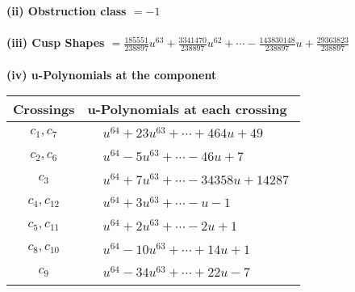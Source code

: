 \documentclass[1p]{elsarticle_modified}
\theoremstyle{definition}
\begin{document}
\flushleft \textbf{(ii) Obstruction class $= -1$}\\~\\
\flushleft \textbf{(iii) Cusp Shapes $= \frac{185551}{238897} u^{63}+\frac{3341470}{238897} u^{62}+\cdots-\frac{143830148}{238897} u+\frac{29363823}{238897}$}\\~\\
\newpage\renewcommand{\arraystretch}{1}
\flushleft \textbf{(iv) u-Polynomials at the component}\newline \\
\begin{tabular}{m{50pt}|m{274pt}}
Crossings & \hspace{64pt}u-Polynomials at each crossing \\
\hline $$\begin{aligned}c_{1},c_{7}\end{aligned}$$&$\begin{aligned}
&u^{64}+23 u^{63}+\cdots+464 u+49
\end{aligned}$\\
\hline $$\begin{aligned}c_{2},c_{6}\end{aligned}$$&$\begin{aligned}
&u^{64}-5 u^{63}+\cdots-46 u+7
\end{aligned}$\\
\hline $$\begin{aligned}c_{3}\end{aligned}$$&$\begin{aligned}
&u^{64}+7 u^{63}+\cdots-34358 u+14287
\end{aligned}$\\
\hline $$\begin{aligned}c_{4},c_{12}\end{aligned}$$&$\begin{aligned}
&u^{64}+3 u^{63}+\cdots- u-1
\end{aligned}$\\
\hline $$\begin{aligned}c_{5},c_{11}\end{aligned}$$&$\begin{aligned}
&u^{64}+2 u^{63}+\cdots-2 u+1
\end{aligned}$\\
\hline $$\begin{aligned}c_{8},c_{10}\end{aligned}$$&$\begin{aligned}
&u^{64}-10 u^{63}+\cdots+14 u+1
\end{aligned}$\\
\hline $$\begin{aligned}c_{9}\end{aligned}$$&$\begin{aligned}
&u^{64}-34 u^{63}+\cdots+22 u-7
\end{aligned}$\\
\hline
\end{tabular}\\~\\
\end{document}

